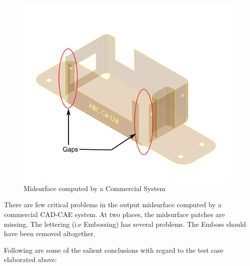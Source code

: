 \begin{figure}[!h]
\centering     %
\includegraphics[width=0.62\linewidth,valign=t]{images/SheetMetal_Medium_Enclosure_InventorMidsurfwithErrors.pdf}
\caption{Midsurface computed by a Commercial System}
\label{fig:results:InventorMidsurfwithErrors}
\end{figure}


%
%
%

There are few critical problems in the output midsurface computed by a commercial CAD-CAE system. At two places, the midsurface patches are missing. The lettering (i.e Embossing) has several problems. The Emboss should have been removed altogether.%

Following are some of the salient conclusions with regard to the test case elaborated above:

